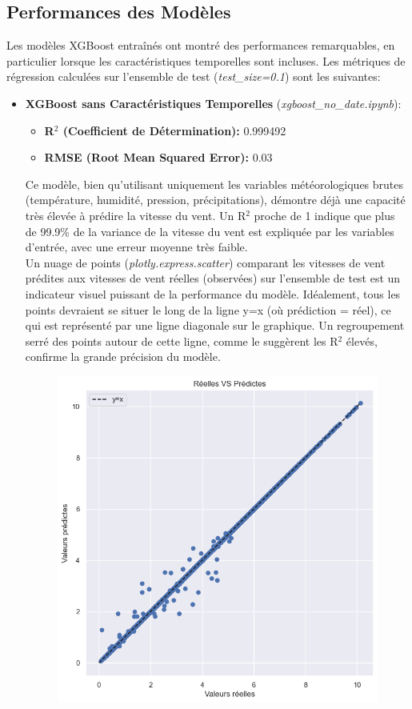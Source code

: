 \documentclass[12pt]{article}
\begin{document}
\subsection{Performances des Modèles}
Les modèles XGBoost entraînés ont montré des performances remarquables, en particulier lorsque les caractéristiques temporelles sont incluses. Les métriques de régression calculées sur l'ensemble de test (\textit{test\_size=0.1}) sont les suivantes:
\begin{itemize}[label=$\color{blue}\ast$]
	\item \textbf{\color{blue}XGBoost sans Caractéristiques Temporelles} (\textit{xgboost\_no\_date.ipynb}):
	\begin{itemize}[label=$\color{blue}\triangleright$]
		\item \textbf{R$^2$ (Coefficient de Détermination):} 0.999492
		\item \textbf{RMSE (Root Mean Squared Error):} 0.03
	\end{itemize}
	Ce modèle, bien qu'utilisant uniquement les variables météorologiques brutes (température, humidité, pression, précipitations), démontre déjà une capacité très élevée à prédire la vitesse du vent. Un R$^2$ proche de 1 indique que plus de 99.9\% de la variance de la vitesse du vent est expliquée par les variables d'entrée, avec une erreur moyenne très faible.\\
	Un nuage de points (\textit{plotly.express.scatter}) comparant les vitesses de vent prédites aux vitesses de vent réelles (observées) sur l'ensemble de test est un indicateur visuel puissant de la performance du modèle. Idéalement, tous les points devraient se situer le long de la ligne y=x (où prédiction = réel), ce qui est représenté par une ligne diagonale sur le graphique. Un regroupement serré des points autour de cette ligne, comme le suggèrent les R$^2$ élevés, confirme la grande précision du modèle. 
	\begin{figure}[H]
		\centering
		\includegraphics[width=0.7\linewidth]{../graphique/test_xgboost_no_date}

\end{figure}
\end{itemize}
\end{document}
